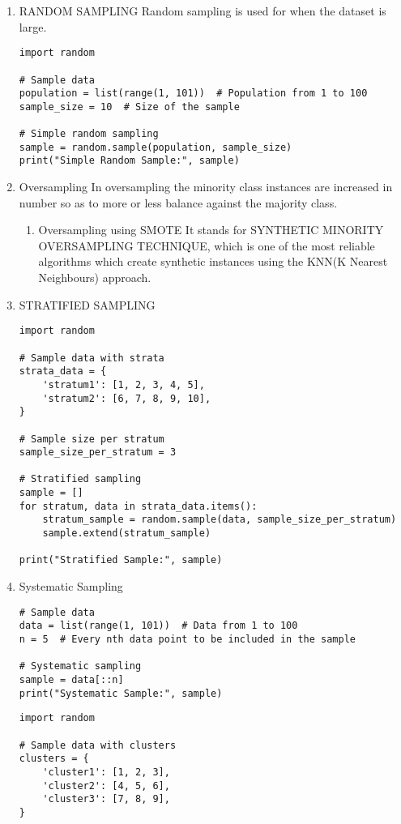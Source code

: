 \documentclass[11pt]{article}
\begin{document}
\begin{enumerate}
\item RANDOM SAMPLING
\label{sec:org2205d86}
Random sampling is used for when the dataset is large.
\begin{verbatim}
import random

# Sample data
population = list(range(1, 101))  # Population from 1 to 100
sample_size = 10  # Size of the sample

# Simple random sampling
sample = random.sample(population, sample_size)
print("Simple Random Sample:", sample)
\end{verbatim}
\item Oversampling
\label{sec:orgdb6bb17}
In oversampling the minority class instances are increased in number so as to more or less balance against the majority class.
\begin{enumerate}
\item Oversampling using SMOTE
\label{sec:orga037daf}
It stands for SYNTHETIC MINORITY OVERSAMPLING TECHNIQUE, which is one of the most reliable algorithms which create synthetic instances using the KNN(K Nearest Neighbours) approach.
\end{enumerate}
\item STRATIFIED SAMPLING
\label{sec:org6d2a498}
\begin{verbatim}
import random

# Sample data with strata
strata_data = {
    'stratum1': [1, 2, 3, 4, 5],
    'stratum2': [6, 7, 8, 9, 10],
}

# Sample size per stratum
sample_size_per_stratum = 3

# Stratified sampling
sample = []
for stratum, data in strata_data.items():
    stratum_sample = random.sample(data, sample_size_per_stratum)
    sample.extend(stratum_sample)

print("Stratified Sample:", sample)
\end{verbatim}
\item Systematic Sampling
\label{sec:org94b123e}
\begin{verbatim}
# Sample data
data = list(range(1, 101))  # Data from 1 to 100
n = 5  # Every nth data point to be included in the sample

# Systematic sampling
sample = data[::n]
print("Systematic Sample:", sample)
\end{verbatim}


\begin{verbatim}
import random

# Sample data with clusters
clusters = {
    'cluster1': [1, 2, 3],
    'cluster2': [4, 5, 6],
    'cluster3': [7, 8, 9],
}


\end{verbatim}
\end{enumerate}
\end{document}
